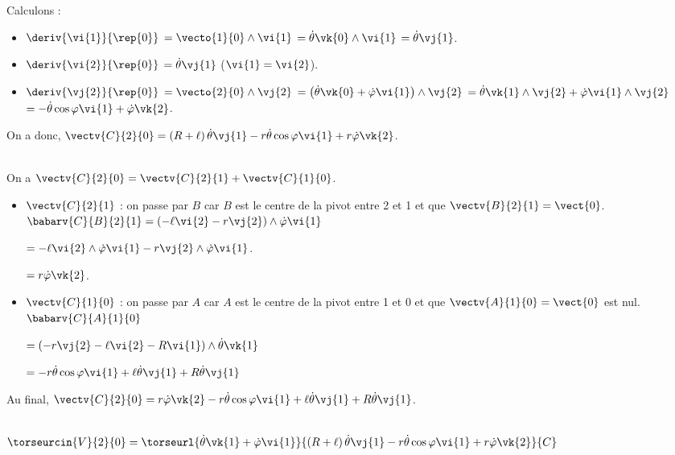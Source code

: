 Calculons : 
\begin{itemize}
\item $\deriv{\vi{1}}{\rep{0}}$ $=\vecto{1}{0} \wedge \vi{1}$ $=\dot{\theta}\vk{0} \wedge \vi{1}$ $=\dot{\theta}\vj{1}$.
\item $\deriv{\vi{2}}{\rep{0}}$ $=\dot{\theta}\vj{1}$ ($\vi{1}=\vi{2}$).
\item $\deriv{\vj{2}}{\rep{0}}$ $=\vecto{2}{0} \wedge \vj{2}$ 
$=\left(\dot{\theta}\vk{0}+ \dot{\varphi}\vi{1} \right) \wedge \vj{2}$
$=\dot{\theta}\vk{1} \wedge \vj{2}+ \dot{\varphi}\vi{1}  \wedge \vj{2}$
$=-\dot{\theta}\cos\varphi \vi{1} + \dot{\varphi}\vk{2} $.
\end{itemize}

On a donc, 
$\vectv{C}{2}{0}= \left(R+\ell\right)\dot{\theta}\vj{1} -r\dot{\theta}\cos\varphi \vi{1} + r\dot{\varphi}\vk{2}$.
\else
\fi


\ifprof ~\\
On a $\vectv{C}{2}{0}= \vectv{C}{2}{1}+\vectv{C}{1}{0}$.
\begin{itemize}
\item $\vectv{C}{2}{1}$ : on passe par $B$ car $B$ est le centre de la pivot entre 2 et 1 et que $\vectv{B}{2}{1}=\vect{0}$. 
$\babarv{C}{B}{2}{1} =\left(-\ell\vi{2}-r\vj{2} \right)\wedge \dot{\varphi}\vi{1} $ 

$=-\ell\vi{2}\wedge \dot{\varphi}\vi{1}-r\vj{2} \wedge \dot{\varphi}\vi{1}$.

$=r\dot{\varphi}\vk{2}$.

\item $\vectv{C}{1}{0}$ : on passe par $A$ car $A$ est le centre de la pivot entre 1 et 0 et que $\vectv{A}{1}{0}=\vect{0}$ est nul. 
$\babarv{C}{A}{1}{0}$ 

$=\left(-r\vj{2}-\ell\vi{2}-R\vi{1}\right)\wedge \dot{\theta}\vk{1}$

$=-r\dot{\theta}\cos\varphi\vi{1}+\ell\dot{\theta}\vj{1}+R\dot{\theta}\vj{1}$ %
\end{itemize}

Au final, 
 $\vectv{C}{2}{0}=r\dot{\varphi}\vk{2}-r\dot{\theta}\cos\varphi\vi{1}+\ell\dot{\theta}\vj{1}+R\dot{\theta}\vj{1}$.
\else
\fi


\ifprof ~\\
$\torseurcin{V}{2}{0} = \torseurl{\dot{\theta}\vk{1}+ \dot{\varphi}\vi{1}}{\left(R+\ell\right)\dot{\theta}\vj{1} -r\dot{\theta}\cos\varphi \vi{1} + r\dot{\varphi}\vk{2}}{C}$
\else
\fi

